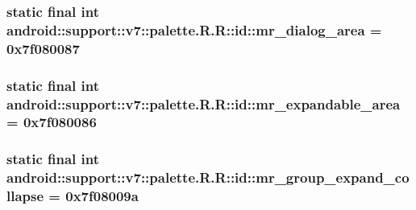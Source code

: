 \hypertarget{classandroid_1_1support_1_1v7_1_1palette_1_1_r_1_1id_183068017642f7fb3d20227be3e7b042}{
\subsubsection[{mr\_\-dialog\_\-area}]{\setlength{\rightskip}{0pt plus 5cm}static final int android::support::v7::palette.R.R::id::mr\_\-dialog\_\-area = 0x7f080087}}
\label{classandroid_1_1support_1_1v7_1_1palette_1_1_r_1_1id_183068017642f7fb3d20227be3e7b042}


\hypertarget{classandroid_1_1support_1_1v7_1_1palette_1_1_r_1_1id_13437d1a9fbe86880f57578c32257cf9}{
\subsubsection[{mr\_\-expandable\_\-area}]{\setlength{\rightskip}{0pt plus 5cm}static final int android::support::v7::palette.R.R::id::mr\_\-expandable\_\-area = 0x7f080086}}
\label{classandroid_1_1support_1_1v7_1_1palette_1_1_r_1_1id_13437d1a9fbe86880f57578c32257cf9}


\hypertarget{classandroid_1_1support_1_1v7_1_1palette_1_1_r_1_1id_8f65aedf30324175b63c01cf346fc9e0}{
\subsubsection[{mr\_\-group\_\-expand\_\-collapse}]{\setlength{\rightskip}{0pt plus 5cm}static final int android::support::v7::palette.R.R::id::mr\_\-group\_\-expand\_\-collapse = 0x7f08009a}}
\label{classandroid_1_1support_1_1v7_1_1palette_1_1_r_1_1id_8f65aedf30324175b63c01cf346fc9e0}


